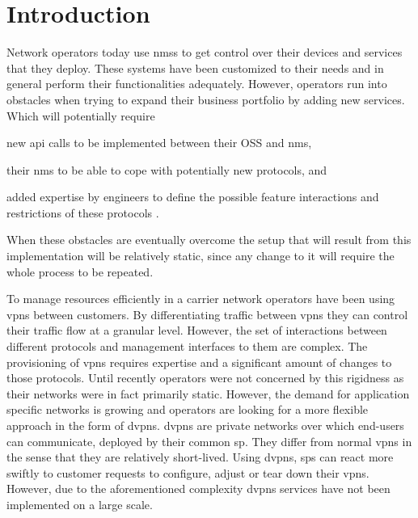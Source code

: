 \section{Introduction} %
\label{sec:introduction}
Network operators today use \acp{nms} to get control over their devices and services that they deploy. These systems have been customized to their needs and in general perform their functionalities adequately. However, operators run into obstacles when trying to expand their business portfolio by adding new services. Which will potentially require
\begin{inparaenum}
	\item new \ac{api} calls to be implemented between their OSS and \ac{nms}, 
	\item their \ac{nms} to be able to cope with potentially new protocols, and
	\item added expertise by engineers to define the possible feature interactions and restrictions of these protocols \cite{programmability-answer}. 
\end{inparaenum}
When these obstacles are eventually overcome the setup that will result from this implementation will be relatively static, since any change to it will require the whole process to be repeated.


To manage resources efficiently in a carrier network operators have been using \acp{vpn} between customers. By differentiating traffic between \acp{vpn} they can control their traffic flow at a granular level. However, the set of interactions between different protocols and management interfaces to them are complex. The provisioning of \acp{vpn} requires expertise and a significant amount of changes to those protocols. Until recently operators were not concerned by this rigidness as their networks were in fact primarily static. However, the demand for application specific networks is growing and operators are looking for a more flexible approach in the form of \acp{dvpn}. \acp{dvpn} are private networks over which end-users can communicate, deployed by their common \ac{sp}. They differ from normal \acp{vpn} in the sense that they are relatively short-lived. Using \acp{dvpn}, \acp{sp} can react more swiftly to customer requests to configure, adjust or tear down their \acp{vpn}. However, due to the aforementioned complexity \acp{dvpn} services have not been implemented on a large scale.

